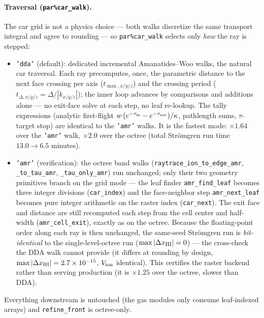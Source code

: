 \documentclass[english,a4paper]{my_memo}
\newcommand{\code}[1]{\texttt{#1}}
\begin{document}
\paragraph{Traversal (\code{par\%car\_walk}).}  The car grid is not a
physics choice --- both walks discretize the same transport integral and
agree to rounding --- so \code{par\%car\_walk} selects only \emph{how}
the ray is stepped:
\begin{itemize}
\item \code{'dda'} (default): dedicated incremental Amanatides--Woo
  walks, the natural car traversal.  Each ray precomputes, once, the
  parametric distance to the next face crossing per axis
  ($t_{\max,x/y/z}$) and the crossing period
  ($t_{\Delta,x/y/z} = \Delta/|k_{x/y/z}|$); the inner loop advances
  by comparisons and additions alone --- no exit-face solve at each
  step, no leaf re-lookup.  The tally expressions (analytic
  first-flight $w\,(e^{-\tau_{\rm in}} - e^{-\tau_{\rm out}})/\kappa$,
  pathlength sums, $\tau$-target stop) are identical to the \code{'amr'}
  walks.  It is the fastest mode: $\times 1.64$ over the \code{'amr'} walk,
  $\times 2.0$ over the octree (total Str\"omgren run time
  $13.0 \to 6.5$ minutes).
\item \code{'amr'} (verification): the octree band walks
  (\code{raytrace\_ion\_to\_edge\_amr}, \code{\_to\_tau\_amr},
  \code{\_tau\_only\_amr}) run unchanged; only their two geometry
  primitives branch on the grid mode --- the leaf finder
  \code{amr\_find\_leaf} becomes three integer divisions
  (\code{car\_index}) and the face-neighbor step
  \code{amr\_next\_leaf} becomes pure integer arithmetic on the
  raster index (\code{car\_next}).  The exit face and distance are
  still recomputed each step from the cell center and half-width
  (\code{amr\_cell\_exit}), exactly as on the octree.  Because the
  floating-point order along each ray is then unchanged, the same-seed
  Str\"omgren run is \emph{bit-identical} to the single-level-octree
  run ($\max|\Delta x_{\rm HI}| = 0$) --- the cross-check the DDA walk
  cannot provide (it differs at rounding by design,
  $\max|\Delta x_{\rm HI}| = 2.7\times10^{-15}$, $V_{\rm ion}$
  identical).  This certifies the raster backend rather than serving
  production (it is $\times 1.25$ over the octree, slower than DDA).
\end{itemize}

Everything downstream is untouched (the gas modules only consume
leaf-indexed arrays) and \code{refine\_front} is octree-only.
\end{document}
